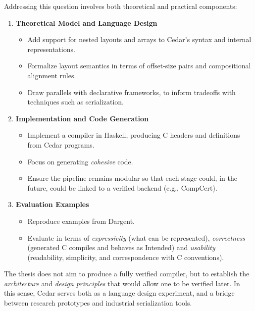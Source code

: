 Addressing this question involves both theoretical and practical components:
\begin{enumerate}
    \item \textbf{Theoretical Model and Language Design}
        \begin{itemize}
            \item Add support for nested layouts and arrays to
            Cedar's syntax and internal representations.
            \item Formalize layout semantics in terms of offset-size pairs
            and compositional alignment rules.
            \item Draw parallels with declarative frameworks, to inform
            tradeoffs with techniques such as serialization. 
        \end{itemize}
    \item \textbf{Implementation and Code Generation}
        \begin{itemize}
            \item Implement a compiler in Haskell, producing C headers and
            definitions from Cedar programs.
            \item Focus on generating \textit{cohesive} code.
            \item Ensure the pipeline remains modular so that each stage could,
            in the future, could be linked to a verified backend (e.g., CompCert).
        \end{itemize}
    \item \textbf{Evaluation Examples}
        \begin{itemize}
            \item Reproduce examples from Dargent.
            \item Evaluate in terms of \textit{expressivity} (what can be
            represented), \textit{correctness} (generated C compiles and behaves
            as Intended) and \textit{usability} (readability, simplicity, and
            correspondence with C conventions).

        \end{itemize}
\end{enumerate}

The thesis does not aim to produce a fully verified compiler, but to establish the
\textit{architecture} and \textit{design principles} that would allow
one to be verified later. In this sense, Cedar serves both as a language
design experiment, and a bridge between research prototypes and industrial
serialization tools.

